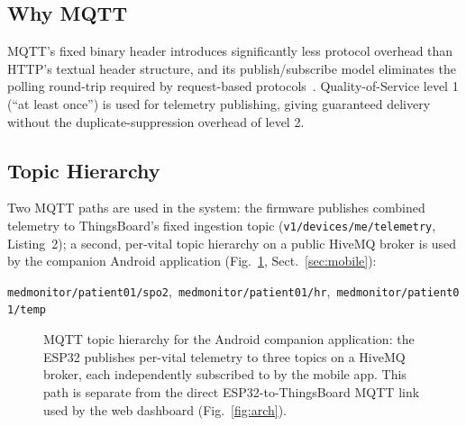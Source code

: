 \documentclass[pdflatex,sn-mathphys-num]{sn-jnl}
\begin{document}
\subsection{Why MQTT}

MQTT's fixed binary header introduces significantly less protocol
overhead than HTTP's textual header structure, and its
publish/subscribe model eliminates the polling round-trip required
by request-based protocols~\cite{mqtt311}. Quality-of-Service level 1
(``at least once'') is used for telemetry publishing, giving
guaranteed delivery without the duplicate-suppression overhead of
level 2.

\subsection{Topic Hierarchy}

Two MQTT paths are used in the system: the firmware publishes
combined telemetry to ThingsBoard's fixed ingestion topic
(\texttt{v1/devices/me/telemetry}, Listing~2); a second, per-vital
topic hierarchy on a public HiveMQ broker is used by the companion
Android application (Fig.~\ref{fig:hivemq-arch},
Sect.~\ref{sec:mobile}):
\begin{center}
\footnotesize\texttt{medmonitor/patient01/spo2},\ \texttt{medmonitor/patient01/hr},\ \texttt{medmonitor/patient01/temp}
\end{center}

\begin{figure}[!htbp]
\centering
{}
\caption{MQTT topic hierarchy for the Android companion application:
the ESP32 publishes per-vital telemetry to three topics on a HiveMQ
broker, each independently subscribed to by the mobile app. This
path is separate from the direct ESP32-to-ThingsBoard MQTT link used
by the web dashboard (Fig.~\ref{fig:arch}).}\label{fig:hivemq-arch}
\end{figure}
\end{document}
